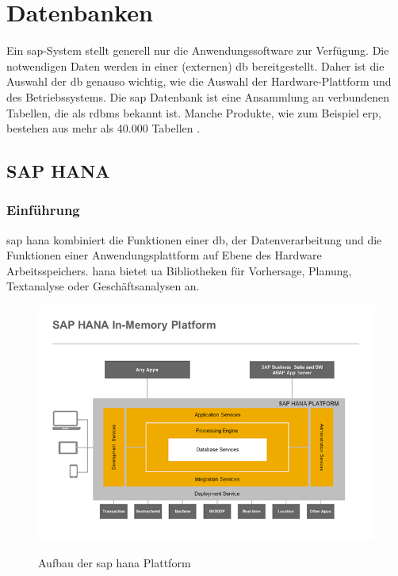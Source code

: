 \section{Datenbanken}
Ein \gls{sap}-System stellt generell nur die Anwendungssoftware zur Verfügung. Die notwendigen Daten werden in einer (externen) \gls{db} bereitgestellt. Daher ist die Auswahl der \gls{db} genauso wichtig, wie die Auswahl der Hardware-Plattform und des Betriebssystems.
Die \gls{sap} Datenbank ist eine Ansammlung an verbundenen Tabellen, die als \gls{rdbms} bekannt ist. Manche Produkte, wie zum Beispiel \gls{erp}, bestehen aus mehr als 40.000 Tabellen \cite{SAPin24hrs}.

\subsection{SAP HANA}
\label{sec:db-hana}

\subsubsection{Einführung}
\label{sec:db-hana-intro}
\gls{sap} \gls{hana} kombiniert die Funktionen einer \gls{db}, der Datenverarbeitung und die Funktionen einer Anwendungsplattform auf Ebene des Hardware Arbeitsspeichers. \gls{hana} bietet \gls{ua} Bibliotheken für Vorhersage, Planung, Textanalyse oder Geschäftsanalysen an.\\

\begin{figure}[H]
	\begin{center}
	\includegraphics[width=1\linewidth]{grafiken/hana-features-overview.png}
	\vspace{-20pt}
	\caption{Aufbau der \gls{sap} \gls{hana} Plattform \cite{SAPHanaAbout}}
	\vspace{-10pt}
	\label{abb:SAPHanaAbout}
	\end{center}
\end{figure}

